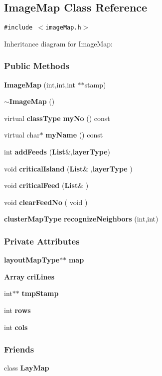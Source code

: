 \subsection{Image\-Map  Class Reference}
\label{ImageMap}
{\tt \#include $<$image\-Map.h$>$}

Inheritance diagram for Image\-Map:\begin{figure}[H]
\begin{center}
\leavevmode
\setlength{\epsfysize}{6cm}
\end{center}
\end{figure}
\subsubsection*{Public Methods}
\begin{CompactItemize}
\item 
{\bf Image\-Map} (int,int,int $\ast$$\ast$stamp)
\item 
{\bf $\sim$Image\-Map} ()
\item 
virtual {\bf class\-Type} {\bf my\-No} () const
\item 
virtual char$\ast$ {\bf my\-Name} () const
\item 
int {\bf add\-Feeds} ({\bf List}\&,{\bf layer\-Type})
\item 
void {\bf critical\-Island} ({\bf List}\& ,{\bf layer\-Type} )
\item 
void {\bf critical\-Feed} ({\bf List}\& )
\item 
void {\bf clear\-Feed\-No} ( void )
\item 
{\bf cluster\-Map\-Type} {\bf recognize\-Neighbors} (int,int)
\end{CompactItemize}
\subsubsection*{Private Attributes}
\begin{CompactItemize}
\item 
{\bf layout\-Map\-Type}$\ast$$\ast$ {\bf map}
\item 
{\bf Array} {\bf cri\-Lines}
\item 
int$\ast$$\ast$ {\bf tmp\-Stamp}
\item 
int {\bf rows}
\item 
int {\bf cols}
\end{CompactItemize}
\subsubsection*{Friends}
\begin{CompactItemize}
\item 
class {\bf Lay\-Map}
\end{CompactItemize}


